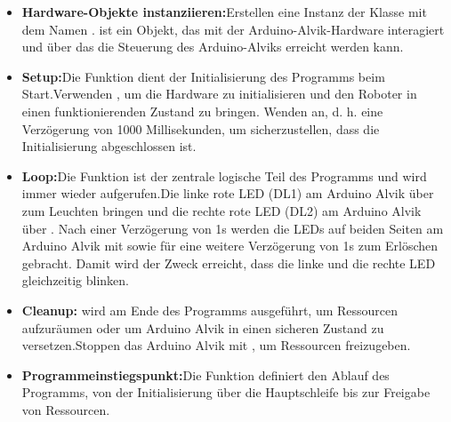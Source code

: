 \begin{enumerate}
\begin{itemize}
		\item \textbf{Hardware-Objekte instanziieren:}Erstellen eine Instanz der Klasse  mit dem Namen .  ist ein Objekt, das mit der Arduino-Alvik-Hardware interagiert und über das die Steuerung des Arduino-Alviks erreicht werden kann.
		\item \textbf{Setup:}Die Funktion  dient der Initialisierung des Programms beim Start.Verwenden , um die Hardware zu initialisieren und den Roboter in einen funktionierenden Zustand zu bringen. Wenden  an, d. h. eine Verzögerung von 1000 Millisekunden, um sicherzustellen, dass die Initialisierung abgeschlossen ist.
		\item \textbf{Loop:}Die Funktion  ist der zentrale logische Teil des Programms und wird immer wieder aufgerufen.Die linke rote LED (DL1) am Arduino Alvik über  zum Leuchten bringen und die rechte rote LED (DL2) am Arduino Alvik über . Nach einer Verzögerung von 1s werden die LEDs auf beiden Seiten am Arduino Alvik mit  sowie  für eine weitere Verzögerung von 1s zum Erlöschen gebracht. Damit wird der Zweck erreicht, dass die linke und die rechte LED gleichzeitig blinken.
		\item \textbf{Cleanup:} wird am Ende des Programms ausgeführt, um Ressourcen aufzuräumen oder um Arduino Alvik in einen sicheren Zustand zu versetzen.Stoppen das Arduino Alvik mit , um Ressourcen freizugeben.
		\item \textbf{Programmeinstiegspunkt:}Die Funktion  definiert den Ablauf des Programms, von der Initialisierung über die Hauptschleife bis zur Freigabe von Ressourcen.
	\end{itemize}
	

\end{enumerate}
